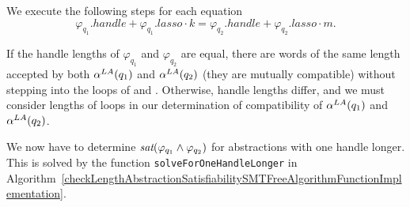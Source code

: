 We execute the following steps for each equation
\[
    \varphi_{q_1}.handle + \varphi_{q_1}.lasso \cdot k = \varphi_{q_2}.handle + \varphi_{q_2}.lasso \cdot m \text{.}
\]

If the handle lengths of $\varphi_{q_1}$ and $\varphi_{q_2}$ are equal, there are words of the same length accepted by both $\alpha^{LA}(q_1)$ and $\alpha^{LA}(q_2)$ (they are mutually compatible) without stepping into the loops of  and . Otherwise, handle lengths differ, and we must consider lengths of loops in our determination of compatibility of $\alpha^{LA}(q_1)$ and $\alpha^{LA}(q_2)$.

We now have to determine $\emph{sat}(\varphi_{q_1} \land \varphi_{q_2})$ for abstractions with one handle longer. This is solved by the function \texttt{solveForOneHandleLonger} in Algorithm~\ref{checkLengthAbstractionSatisfiabilitySMTFreeAlgorithmFunctionImplementation}.

